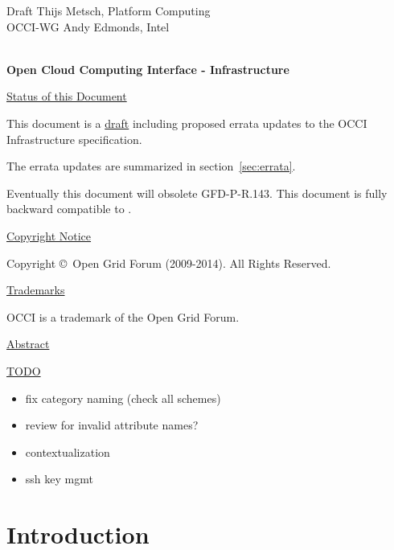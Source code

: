 \documentclass[10pt,a4paper]{article}
\begin{document}
\thispagestyle{empty}

Draft \hfill  Thijs Metsch, Platform Computing\\
OCCI-WG \hfill  Andy Edmonds, Intel\\
\\

\vspace*{0.5in}

\begin{Large}
\textbf{Open Cloud Computing Interface - Infrastructure}
\end{Large}

\vspace*{0.5in}

\underline{Status of this Document}

% 

This document is a \underline{draft} including proposed errata updates
to the OCCI Infrastructure \cite{occi:infrastructure} specification.

The errata updates are summarized in section~\ref{sec:errata}.

Eventually this document will obsolete GFD-P-R.143. This document is
fully backward compatible to \cite{occi:infrastructure}.

\underline{Copyright Notice}

Copyright \copyright ~Open Grid Forum (2009-2014). All Rights
Reserved.

\underline{Trademarks}

OCCI is a trademark of the Open Grid Forum.

\underline{Abstract}



{\color{red}
\underline{TODO}
\begin{itemize}
\item fix category naming (check all schemes)
\item review for invalid attribute names?
\item contextualization
\item ssh key mgmt
\end{itemize}
}

\newpage
\tableofcontents
\newpage

\section{Introduction}

\end{document}
